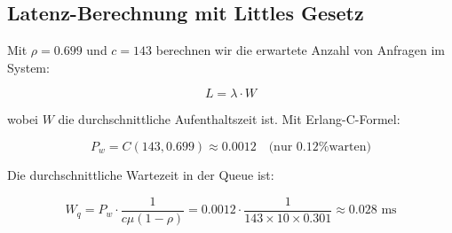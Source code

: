 \documentclass[a4paper,11pt]{article}
\theoremstyle{definition}
\begin{document}
    
    
    
    
    
    

\subsection{Latenz-Berechnung mit Littles Gesetz}

Mit $\rho = 0.699$ und $c = 143$ berechnen wir die erwartete Anzahl von Anfragen im System:

\[
L = \lambda \cdot W
\]

wobei $W$ die durchschnittliche Aufenthaltszeit ist. Mit Erlang-C-Formel:

\[
P_w = C(143, 0.699) \approx 0.0012 \quad \text{(nur 0.12\% warten)}
\]

Die durchschnittliche Wartezeit in der Queue ist:

\[
W_q = P_w \cdot \frac{1}{c \mu (1 - \rho)} = 0.0012 \cdot \frac{1}{143 \times 10 \times 0.301} \approx 0.028 \text{ ms}
\]
\end{document}
